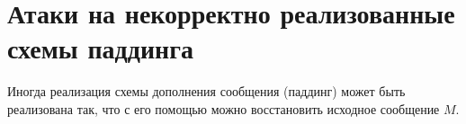 \documentclass[12pt,a4paper]{scrartcl}
\begin{document}
\section{Атаки на некорректно реализованные схемы паддинга}

Иногда реализация схемы дополнения сообщения (паддинг) может быть реализована так, что с его помощью можно восстановить исходное сообщение $M$.
\end{document}
